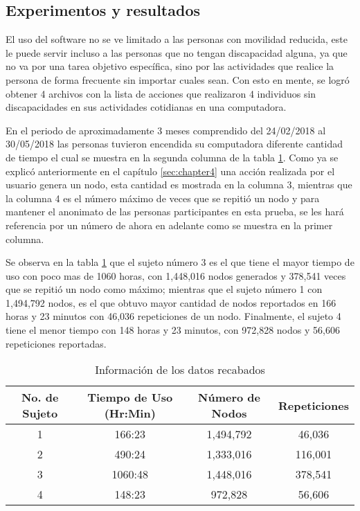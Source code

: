 \subsection{Experimentos y resultados}

El uso del software no se ve limitado a las personas con movilidad reducida, este le puede servir incluso a las personas que no tengan discapacidad alguna, ya que no va por una tarea objetivo espec\'ifica, sino por las actividades que realice la persona de forma frecuente sin importar cuales sean. Con esto en mente, se logr\'o obtener 4 archivos con la lista de acciones que realizaron 4 individuos sin discapacidades en sus actividades cotidianas en una computadora.


En el periodo de aproximadamente 3 meses comprendido del 24/02/2018 al 30/05/2018 las personas tuvieron encendida su computadora diferente cantidad de tiempo el cual se muestra en la segunda columna de la tabla \ref{infodata}. Como ya se explic\'o anteriormente en el cap\'itulo \ref{sec:chapter4} una acci\'on realizada por el usuario genera un nodo, esta cantidad es mostrada en la columna 3, mientras que la columna 4 es el n\'umero m\'aximo de veces que se repiti\'o un nodo y para mantener el anonimato de las personas participantes en esta prueba, se les har\'a referencia por un n\'umero de ahora en adelante como se muestra en la primer columna. 

Se observa en la tabla \ref{infodata} que el sujeto n\'umero 3 es el que tiene el mayor tiempo de uso con poco mas de 1060 horas, con 1,448,016 nodos generados y 378,541 veces que se repiti\'o un nodo como m\'aximo; mientras que el sujeto n\'umero 1 con 1,494,792 nodos, es el que obtuvo mayor cantidad de nodos reportados en 166 horas y 23 minutos con 46,036 repeticiones de un nodo. Finalmente, el sujeto 4 tiene el menor tiempo con 148 horas y 23 minutos, con 972,828 nodos y 56,606 repeticiones reportadas.


\begin{table}[]
\centering
\begin{tabular}{cccc}
\hline
		No. de Sujeto	&   Tiempo de Uso (Hr:Min)		&	N\'umero de Nodos	&   Repeticiones 	\\   \hline
		1				&	166:23 						&	1,494,792			&	46,036				\\
		2				&	490:24						&	1,333,016			&	116,001				\\
		3				&	1060:48						&	1,448,016			&	378,541				\\
		4				&	148:23						&	972,828				&	56,606				\\ 
\hline
\end{tabular}
\caption{Informaci\'on de los datos recabados}
\label{infodata}
\end{table}

